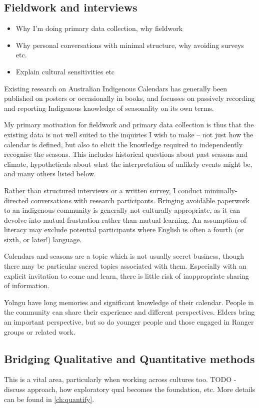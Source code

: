 \subsection{Fieldwork and interviews}

\begin{itemize}
\item Why I'm doing primary data collection, why fieldwork
\item Why personal conversations with minimal structure, why avoiding surveys etc.
\item Explain cultural sensitivities etc
\end{itemize}


Existing research on Australian Indigenous Calendars has generally been 
published on posters or occasionally in books, and focusses on passively 
recording and reporting Indigenous knowledge of seasonality on its own terms.  

My primary motivation for fieldwork and primary data collection is thus that 
the existing data is not well suited to the inquiries I wish to make – not just 
how the calendar is defined, but also to elicit the knowledge required to 
independently recognise the seasons.  This includes historical questions about 
past seasons and climate, hypotheticals about what the interpretation of 
unlikely events might be, and many others listed below.

Rather than structured interviews or a written survey, I conduct minimally-
directed conversations with research participants.  Bringing avoidable 
paperwork to an indigenous community is generally not culturally appropriate, 
as it can devolve into mutual frustration rather than mutual learning.  An 
assumption of literacy may exclude potential participants where English is 
often a fourth (or sixth, or later!) language.

Calendars and seasons are a topic which is not usually secret business, though 
there may be particular sacred topics associated with them.  Especially with an 
explicit invitation to come and learn, there is little risk of inappropriate 
sharing of information.

Yolngu have long memories and significant knowledge of their 
calendar.  People in the community can share their experience and different 
perspectives.  Elders bring an important perspective, but so do younger people 
and those engaged in Ranger groups or related work.


\subsection{Bridging Qualitative and Quantitative methods}
This is a vital area, particularly when working across cultures too.
TODO - discuss approach, how exploratory qual becomes the foundation,
etc.  More details can be found in \autoref{ch:quantify}.


